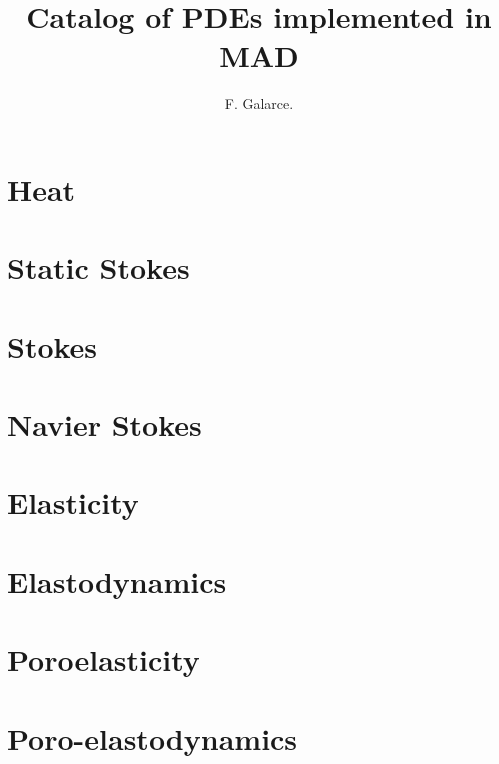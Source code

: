 \documentclass{article}
\begin{document}
\title{
Catalog of PDEs implemented in MAD
}


\author{
F. Galarce.
}

\maketitle

\section{Heat}

\section{Static Stokes}

\section{Stokes}

\section{Navier Stokes}

\section{Elasticity}

\section{Elastodynamics}

\section{Poroelasticity}

\section{Poro-elastodynamics}
\end{document}
